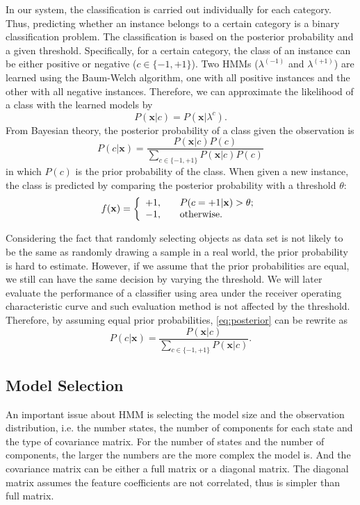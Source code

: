 \documentclass[12pt,final,twoside]{report}
\theoremstyle{plain}
\theoremstyle{definition}
\theoremstyle{remark}
\begin{document}
In our system, the classification is carried out individually for each category. Thus, predicting whether an instance belongs to a certain category is a binary classification problem. The classification is based on the posterior probability and a given threshold. Specifically, for a certain category, the class of an instance can be either positive or negative ($c \in \{-1,+1\}$). Two HMMs ($\lambda^{(-1)}$ and $\lambda^{(+1)}$) are learned using the Baum-Welch algorithm, one with all positive instances and the other with all negative instances. Therefore, we can approximate the likelihood of a class with the learned models by
\begin{equation}
  P(\mathbf{x}|c) = P(\mathbf{x}|\lambda^c) .
\end{equation}
From Bayesian theory, the posterior probability of a class given the observation is
\begin{equation} \label{eq:posterior}
  P(c|\mathbf{x}) = \frac{P(\mathbf{x}|c)P(c)}{\sum_{c \in \{-1,+1\}} P(\mathbf{x}|c)P(c)}
\end{equation}
in which $P(c)$ is the prior probability of the class. When given a new instance, the class is predicted by comparing the posterior probability with a threshold $\theta$:
\begin{equation}
  \label{eq:classif}
  f(\mathbf{x}) = \left\{
  \begin{array}{l l}
    +1, & \quad P(c=+1|\mathbf{x}) > \theta; \\
    -1, & \quad \text{otherwise.}
  \end{array} \right.
\end{equation}

Considering the fact that randomly selecting objects as data set is not likely to be the same as randomly drawing a sample in a real world, the prior probability is hard to estimate. However, if we assume that the prior probabilities are equal, we still can have the same decision by varying the threshold. We will later evaluate the performance of a classifier using area under the receiver operating characteristic curve and such evaluation method is not affected by the threshold. Therefore, by assuming equal prior probabilities, \cref{eq:posterior} can be rewrite as 
\begin{equation}
  \label{eq:postsimp}
  P(c|\mathbf{x}) = \frac{P(\mathbf{x}|c)}{\sum_{c \in \{-1,+1\}} P(\mathbf{x}|c)} .
\end{equation}

\subsection{Model Selection}
An important issue about HMM is selecting the model size and the observation distribution, i.e. the number states, the number of components for each state and the type of covariance matrix. For the number of states and the number of components, the larger the numbers are the more complex the model is. And the covariance matrix can be either a full matrix or a diagonal matrix. The diagonal matrix assumes the feature coefficients are not correlated, thus is simpler than full matrix.
\end{document}
